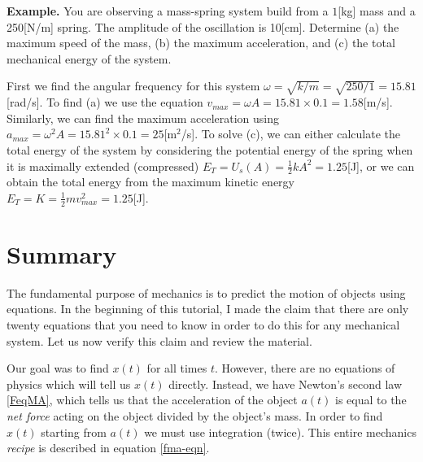 \documentclass[letterpaper,9pt,journal]{IEEEtran}
\begin{document}
{ \bf Example.} 
You are observing a mass-spring system build from a $1$[kg] mass and a 250[N/m] spring.
The amplitude of the oscillation is 10[cm]. Determine (a) the maximum speed of the mass, 
(b) the maximum acceleration, and (c) the total mechanical energy of the system.

First we find the angular frequency for this system $\omega = \sqrt{k/m}=\sqrt{250/1}=15.81$[rad/s].
To find (a) we use the equation $v_{max} = \omega A = 15.81 \times 0.1=1.58$[m/s].
Similarly, we can find the maximum acceleration using $a_{max} = \omega^2 A = 15.81^2 \times 0.1=25$[m$^2$/s].
To solve (c), we can either calculate the total energy of the system by considering the potential energy of the 
spring when it is maximally extended (compressed) $E_T=U_s(A) = \frac{1}{2}kA^2 = 1.25$[J], 
or we can obtain the total energy from the maximum kinetic energy $E_T=K=\frac{1}{2}m v_{max}^2 = 1.25$[J].




\section*{Summary}

The fundamental purpose of mechanics is to predict the motion of objects using equations.
In the beginning of this tutorial, I made the claim that there are only twenty 
equations that you need to know in order to do this
for any mechanical system.
%
Let us now verify this claim and review the material.

Our goal was to find $x(t)$ for all times $t$.
However, there are no equations of physics which will tell us $x(t)$ directly.
Instead, we have Newton's second law \eqref{FeqMA},
which tells us that the acceleration of the object $a(t)$
is equal to the \emph{net force} acting on the object divided by the object's mass.
In order to find $x(t)$ starting from $a(t)$ we must use integration (twice).
This entire mechanics \emph{recipe} is described  in equation \eqref{fma-eqn}.

\end{document}
